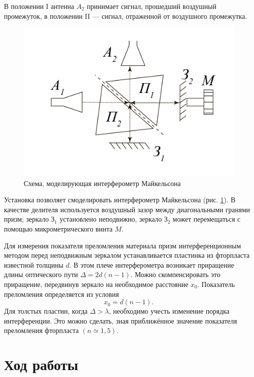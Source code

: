 \documentclass[a4paper, 12pt]{article}
\begin{document}
	В положении I антенна $A_2$ принимает сигнал, прошедший воздушный промежуток, в положении II — сигнал, отраженной от воздушного промежутка.\par
	\begin{figure}
		\includegraphics[scale=0.18]{Michelson.pdf}
		\caption{Схема, моделирующая интерферометр Майкельсона}
		\label{fig:Michelson}
	\end{figure}

	Установка позволяет смоделировать интерферометр Майкельсона (рис. \ref{fig:Michelson}). В качестве делителя используется воздушный зазор между диагональными гранями призм; зеркало $\text{З}_1$ установлено неподвижно, зеркало $\text{З}_2$ может перемещаться с помощью микрометрического винта $M$.\par
	Для измерения показателя преломления материала призм интерференционным методом перед неподвижным зеркалом устанавливается пластинка из фторпласта известной толщины $d$. В этом плече интерферометра возникает приращение длины оптического пути $\Delta=2d\left(n-1\right)$. Можно скомпенсировать это приращение, передвинув зеркало на необходимое расстояние $x_0$. Показатель преломления определяется из условия
	\begin{equation}
		x_0=d\left(n-1\right).
		\label{eq:22}
	\end{equation}
	Для толстых пластин, когда $\Delta>\lambda$, необходимо учесть изменение порядка интерференции. Это можно сделать, зная приближённое значение показателя преломления фторпласта $\left(n\simeq 1,5\right)$.
	\section{Ход работы}
\end{document}
